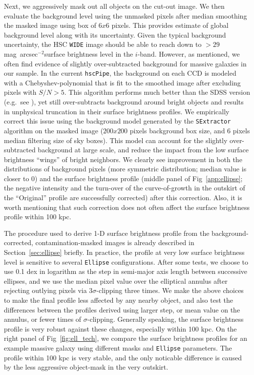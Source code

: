 \documentclass[a4paper,fleqn,usenatbib]{mnras}
\def\sb{mag~arcsec$^{-2}$}
\begin{document}
    Next, we aggressively mask out all objects on the cut-out image.  
    We then evaluate the background level using the unmasked pixels after median 
    smoothing the masked image using box of $6x6$ pixels.
    This provides estimate of global background level along with its uncertainty. 
    Given the typical background uncertainty, the HSC \texttt{WIDE} image should be 
    able to reach down to $> 29$ \sb surface brightness level in the $i$-band.  
    However, as mentioned, we often find evidence of slightly over-subtracted 
    background for massive galaxies in our sample. 
    In the current \texttt{hscPipe}, the background on each CCD is modeled with a 
    Chebyshev-polynomial that is fit to the smoothed image after excluding pixels 
    with $S/N >5$.
    This algorithm performs much better than the SDSS version 
    (e.g.\ see \citealt{Blanton2011}), yet still over-subtracts background around 
    bright objects and results in unphysical truncation in their surface brightness 
    profiles.
    We empirically correct this issue using the background model generated by 
    the \texttt{SExtractor} algorithm on the masked image 
    ($200x200$ pixels background box size, and 6 pixels median filtering size of 
    sky boxes).
    This model can account for the slightly over-subtracted background at large scale,
    and reduce the impact from the low surface brightness ``wings'' of bright 
    neighbors. 
    We clearly see improvement in both the distributions of background pixels 
    (more symmetric distribution; median value is closer to 0) and the surface 
    brightness profile (middle panel of Fig~\ref{app:ellipse}; the negative intensity 
    and the turn-over of the curve-of-growth in the outskirt of the ``Original'' 
    profile are successfully corrected) after this correction.
    Also, it is worth mentioning that such correction does not often affect the 
    surface brightness profile within 100 kpc. 
    
    The procedure used to derive 1-D surface brightness profile from the 
    background-corrected, contamination-masked images is already described in 
    Section~\ref{sec:ellipse} briefly. 
    In practice, the profile at very low surface brightness level is sensitive to 
    several \texttt{Ellipse} configurations.
    After some tests, we choose to use 0.1 dex in logarithm as the step in semi-major 
    axis length between successive ellipses, and we use the median pixel value over the
    elliptical annulus after rejecting outlying pixels via $3\sigma$-clipping three
    times.
    We make the above choices to make the final profile less affected by any nearby
    object, and also test the differences between the profiles derived using larger
    step, or mean value on the annulus, or fewer times of $\sigma$-clipping. 
    Generally speaking, the surface brightness profile is very robust against these
    changes, especially within 100 kpc. 
    On the right panel of Fig~\ref{fig:ell_tech}, we compare the surface brightness
    profiles for an example massive galaxy using different masks and \texttt{Ellipse}
    parameters. 
    The profile within 100 kpc is very stable, and the only noticable difference 
    is caused by the less aggressive object-mask in the very outskirt.    
    
\end{document}

